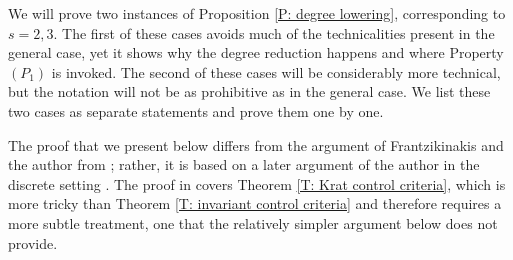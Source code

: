 \documentclass[11pt]{amsart}
\theoremstyle{definition}
\DeclareMathOperator*{\E}{\mathbb{E}}
\newcommand{\CI}{{\mathcal I}}
\newcommand{\norm}[1]{\left\Vert #1\right\Vert}
\newcommand{\nnorm}[1]{\lvert\!|\!| #1|\!|\!\rvert}
\newcommand{\1}{{\mathbf{1}}}
\begin{document}

We will prove two instances of Proposition \ref{P: degree lowering}, corresponding to $s=2,3$. The first of these cases avoids much of the technicalities present in the general case, yet it shows why the degree reduction happens and where Property $(P_1)$ is invoked. The second of these cases will be considerably more technical, but the notation will not be as prohibitive as in the general case. We list these two cases as separate statements and prove them one by one.

The proof that we present below differs from the argument of Frantzikinakis and the author from \cite{FrKu22a}; rather, it is based on a later argument of the author in the discrete setting \cite{Kuc23}. The proof in \cite{FrKu22a} covers Theorem \ref{T: Krat control criteria}, which is more tricky than Theorem \ref{T: invariant control criteria} and therefore requires a more subtle treatment, one that the relatively simpler argument below does not provide. 
\end{document}
